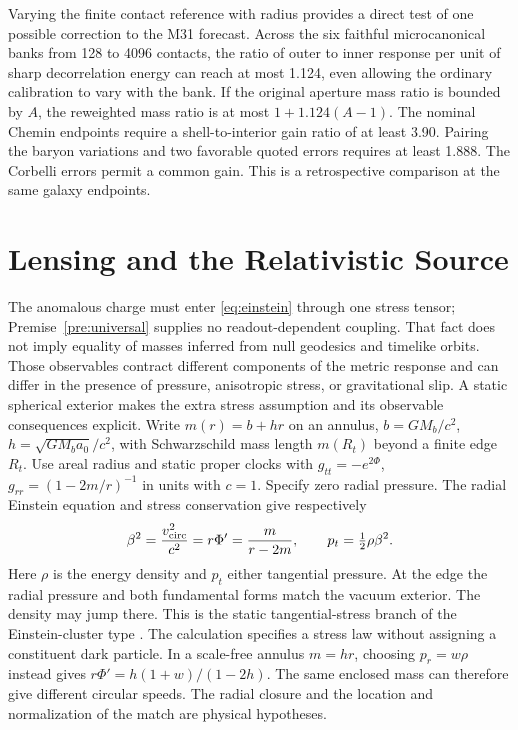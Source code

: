 \documentclass[11pt]{article}
\begin{document}
Varying the finite contact reference with radius provides a direct
test of one possible correction to the M31 forecast. Across the six
faithful microcanonical banks from 128 to 4096 contacts, the ratio
of outer to inner response per unit of sharp decorrelation energy
can reach at most 1.124, even allowing the ordinary calibration to
vary with the bank. If the original aperture mass ratio is bounded
by $A$, the reweighted mass ratio is at most $1+1.124(A-1)$.
The nominal Chemin endpoints require a shell-to-interior gain ratio
of at least 3.90. Pairing the baryon variations and two favorable
quoted errors requires at least 1.888. The Corbelli errors
permit a common gain. This is a retrospective comparison at the same galaxy endpoints.

\section{Lensing and the Relativistic Source}
\label{sec:lensing}

The anomalous charge must enter \eqref{eq:einstein} through one stress tensor;
Premise~\ref{pre:universal} supplies no readout-dependent coupling. That fact
does not imply equality of masses inferred from null geodesics and timelike
orbits. Those observables contract different components of the metric response
and can differ in the presence of pressure, anisotropic stress, or gravitational
slip. A static spherical exterior makes the extra stress assumption and its
observable consequences explicit. Write $m(r)=b+hr$ on an annulus,
$b=GM_b/c^2$, $h=\sqrt{GM_ba_0}/c^2$, with Schwarzschild mass length
$m(R_t)$ beyond a finite edge $R_t$. Use areal radius and static proper
clocks with $g_{tt}=-e^{2\Phi}$, $g_{rr}=(1-2m/r)^{-1}$ in units with
$c=1$. Specify zero radial pressure. The radial Einstein equation and
stress conservation give respectively
\[
 \beta^2=\frac{v_{\rm circ}^2}{c^2}=r\Phi'
          =\frac{m}{r-2m},\qquad p_t=\tfrac12\rho\beta^2 .
\]
Here $\rho$ is the energy density and $p_t$ either tangential pressure.
At the edge the radial pressure and both fundamental forms match the
vacuum exterior. The density may jump there. This is the static
tangential-stress branch of the Einstein-cluster type
\cite{lakeCluster,pressureOptics}. The calculation specifies a stress
law without assigning a constituent dark particle. In a scale-free
annulus $m=hr$, choosing $p_r=w\rho$ instead gives
$r\Phi'=h(1+w)/(1-2h)$. The same enclosed mass can therefore give
different circular speeds. The radial closure and the location and
normalization of the match are physical hypotheses.
\end{document}

